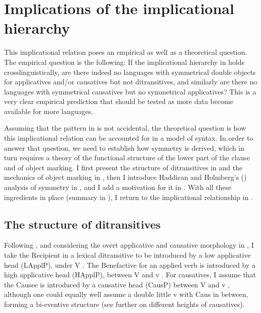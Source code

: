 \documentclass[output=paper]{LSP/langsci}
\begin{document}
\section{Implications of the implicational hierarchy}\label{sec:vdw:3}

This implicational relation poses an empirical as well as a theoretical question. The empirical question is the following: If the implicational hierarchy in  holds crosslinguistically, are there indeed no languages with symmetrical double objects for applicatives and/or causatives but not ditransitives, and similarly are there no languages with symmetrical causatives but no symmetrical applicatives? This is a very clear empirical prediction that should be tested as more data become available for more languages.

Assuming that the pattern in  is not accidental, the theoretical question is how this implicational relation can be accounted for in a model of syntax. In order to answer that question, we need to establish how symmetry is derived, which in turn requires a theory of the functional structure of the lower part of the clause and of object marking. I first present the structure of ditransitives in  and the mechanics of object marking in , then I introduce Haddican and Holmberg’s (\citeyear{HaddicanHolmberg2012,HaddicanHolmberg2015}) analysis of symmetry in , and I add a motivation for it in . With all these ingredients in place (summary in ), I return to the implicational relationship in .

\subsection{The structure of ditransitives}\label{sec:vdw:3.1}

Following \citet{Pylkkänen2008}, and considering the overt applicative and causative morphology in , I take the Recipient in a lexical ditransitive to be introduced by a low applicative head (LApplP), under V . The Benefactive for an applied verb is introduced by a high applicative head (HApplP), between V and v . For causatives, I assume that the Causee is introduced by a causative head (CausP) between V and v , although one could equally well assume a double little v with Caus in between, forming a bi-eventive structure (see further \citealt{Pylkkänen2008} on different heights of causatives).
\end{document}
